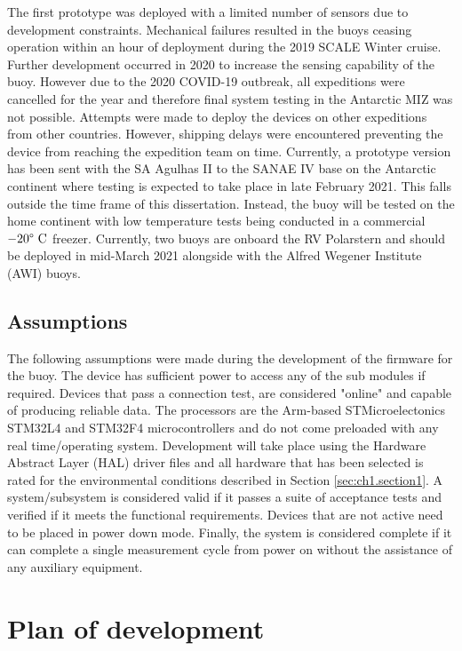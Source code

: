 The first prototype was deployed with a limited number of sensors due to development constraints. Mechanical failures resulted in the buoys ceasing operation within an hour of deployment during the 2019 SCALE Winter cruise. Further development occurred in 2020 to increase the sensing capability of the buoy. However due to the 2020 COVID-19 outbreak, all expeditions were cancelled for the year and therefore final system testing in the Antarctic MIZ was not possible. Attempts were made to deploy the devices on other expeditions from other countries. However, shipping delays were encountered preventing the device from reaching the expedition team on time. Currently, a prototype version has been sent with the SA Agulhas II to the SANAE IV base on the Antarctic continent where testing is expected to take place in late February 2021. This falls outside the time frame of this dissertation. Instead, the buoy will be tested on the home  continent with low temperature tests being conducted in a commercial $-20\degree \text{ C}$ freezer. Currently, two buoys are onboard the RV Polarstern and should be deployed in mid-March 2021 alongside with the Alfred Wegener Institute (AWI) buoys.

\subsection{Assumptions}

The following assumptions were made during the development of the firmware for the buoy. The device has sufficient power to access any of the sub modules if required. Devices that pass a connection test, are considered "online" and capable of producing reliable data. The processors are the Arm-based STMicroelectonics  STM32L4 and STM32F4 microcontrollers and do not come preloaded with any real time/operating system. Development will take place using the Hardware Abstract Layer (HAL) driver files and all hardware that has been selected is rated for the environmental conditions described in Section \ref{sec:ch1.section1}. A system/subsystem is considered valid if it passes a suite of acceptance tests and verified if it meets the functional requirements. Devices that are not active need to be placed in power down mode. Finally, the system is considered complete if it can complete a single measurement cycle from power on without the assistance of any auxiliary equipment.

\section{Plan of development}
\label{sec:ch1.section3}

